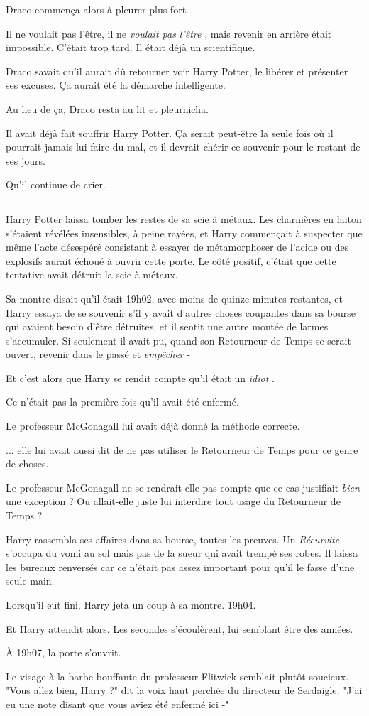 Draco commença alors à pleurer plus fort.

Il ne voulait pas l'être, il ne \emph{voulait pas l'être} , mais revenir en arrière était impossible. C'était trop tard. Il était déjà un scientifique.

Draco savait qu'il aurait dû retourner voir Harry Potter, le libérer et présenter ses excuses. Ça aurait été la démarche intelligente.

Au lieu de ça, Draco resta au lit et pleurnicha.

Il avait déjà fait souffrir Harry Potter. Ça serait peut-être la seule fois où il pourrait jamais lui faire du mal, et il devrait chérir ce souvenir pour le restant de ses jours.

Qu'il continue de crier.
\par\noindent\rule{\textwidth}{0.4pt}
Harry Potter laissa tomber les restes de sa scie à métaux. Les charnières en laiton s'étaient révélées insensibles, à peine rayées, et Harry commençait à suspecter que même l'acte désespéré consistant à essayer de métamorphoser de l'acide ou des explosifs aurait échoué à ouvrir cette porte. Le côté positif, c'était que cette tentative avait détruit la scie à métaux.

Sa montre disait qu'il était 19h02, avec moins de quinze minutes restantes, et Harry essaya de se souvenir s'il y avait d'autres choses coupantes dans sa bourse qui avaient besoin d'être détruites, et il sentit une autre montée de larmes s'accumuler. Si seulement il avait pu, quand son Retourneur de Temps se serait ouvert, revenir dans le passé et \emph{empêcher}  -

Et c'est alors que Harry se rendit compte qu'il était un \emph{idiot} .

Ce n'était pas la première fois qu'il avait été enfermé.

Le professeur McGonagall lui avait déjà donné la méthode correcte.

... elle lui avait aussi dit de ne pas utiliser le Retourneur de Temps pour ce genre de choses.

Le professeur McGonagall ne se rendrait-elle pas compte que ce cas justifiait \emph{bien}  une exception ? Ou allait-elle juste lui interdire tout usage du Retourneur de Temps ?

Harry rassembla ses affaires dans sa bourse, toutes les preuves. Un \emph{Récurvite}  s'occupa du vomi au sol mais pas de la sueur qui avait trempé ses robes. Il laissa les bureaux renversés car ce n'était pas assez important pour qu'il le fasse d'une seule main.

Lorsqu'il eut fini, Harry jeta un coup à sa montre. 19h04.

Et Harry attendit alors. Les secondes s'écoulèrent, lui semblant être des années.

À 19h07, la porte s'ouvrit.

Le visage à la barbe bouffante du professeur Flitwick semblait plutôt soucieux. "Vous allez bien, Harry ?" dit la voix haut perchée du directeur de Serdaigle. "J'ai eu une note disant que vous aviez été enfermé ici -"


